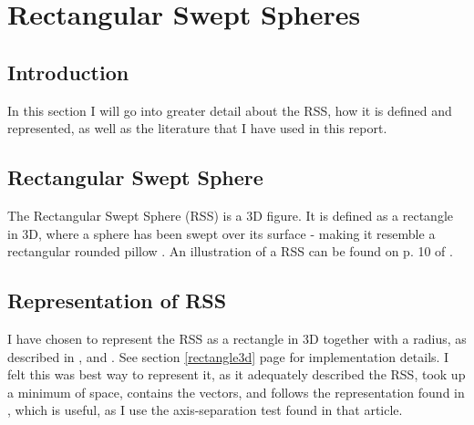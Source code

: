 
\section{Rectangular Swept Spheres}
\label{rss}

\subsection{Introduction}
In this section I will go into greater detail about the RSS, how it is defined and represented, as well as the literature that I have used in this report.

\subsection{Rectangular Swept Sphere}
The Rectangular Swept Sphere (RSS) is a 3D figure. It is defined as a rectangle in 3D, where a sphere has been swept over its surface - making it resemble a rectangular rounded pillow . An illustration of a RSS can be found on p. 10 of \cite{Larsen99fastproximity}. 

\subsection{Representation of RSS}
I have chosen to represent the RSS as a rectangle in 3D together with a radius, as described in \cite{larsen00fast}, \cite{Larsen99fastproximity} and \cite{237244}. See section \ref{rectangle3d} page \pageref{rectangle3d} for  implementation details. I felt this was best way to represent it, as it adequately described the RSS, took up a minimum of space, contains the vectors, and follows the representation found in \cite{237244}, which is useful, as I use the axis-separation test found in that article.

